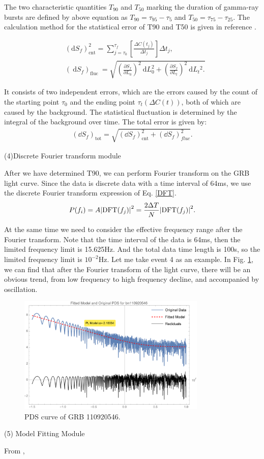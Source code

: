 \documentclass[prd,10pt]{revtex4-2}
\begin{document}
The two characteristic quantities $T_{90}$ and $T_{50}$ marking the duration of gamma-ray bursts are defined by above equation as $T_{90}=\tau_{95}-\tau_{5}$ and $T_{50}=\tau_{75}-\tau_{25}$. The calculation method for the statistical error of T90 and T50 is given in reference \cite{1996ApJ...463..570K}.

\begin{align}
    & \left(\mathrm{d} S_f\right)_{\mathrm{cnt}}^2=\sum_{j=\tau_0}^{\tau_f}\left[\frac{\Delta C\left(t_j\right)}{\Delta t_j}\right] \Delta t_j, \\ & \left(\mathrm{~d} S_f\right)_{\text {fluc }}=\sqrt{\left(\frac{\partial S_f}{\partial L_0}\right)^2 \mathrm{~d} L_0^2+\left(\frac{\partial S_f}{\partial L_t}\right)^2 \mathrm{~d} L_t{ }^2 .}
\end{align}

It consists of two independent errors, which are the errors caused by the count of the starting point $\tau_{0}$ and the ending point $\tau_{t}(\Delta C(t))$, both of which are caused by the background. The statistical fluctuation is determined by the integral of the background over time. The total error is given by:
\begin{align}
    (\dd{S_{f}})_{\text{tot}}=\sqrt{(\dd{S_{f}})^{2}_{\text{cnt}}+(\dd{S_{f}})^{2}_{fluc}}.
\end{align}

(4)Discrete Fourier transform module

After we have determined T90, we can perform Fourier transform on the GRB light curve. Since the data is discrete data with a time interval of 64ms, we use the discrete Fourier transform expression of Eq. \ref{DFT}.
\begin{align}
    P(f_{i})=A\abs{\text{DFT}(f_{j})}^{2}=\frac{2\Delta T}{N}\abs{\text{DFT}(f_{j})}^{2}.
\end{align}

At the same time we need to consider the effective frequency range after the Fourier transform. Note that the time interval of the data is 64ms, then the limited frequency limit is 15.625Hz. And the total data time length is 100s, so the limited frequency limit is $10^{-2}$Hz. Let me take event 4 as an example. In Fig. \ref{fig:pds.png}, we can find that after the Fourier transform of the light curve, there will be an obvious trend, from low frequency to high frequency decline, and accompanied by oscillation.

\begin{figure}[ht]
    \centering
    \includegraphics[width= 0.8\textwidth]{pds.png}
    \caption{\label{fig:pds.png}
        PDS curve of GRB 110920546.
    }
\end{figure}

(5) Model Fitting Module


From \cite{Dichiara:2016oob}, 

\newpage


\end{document}
